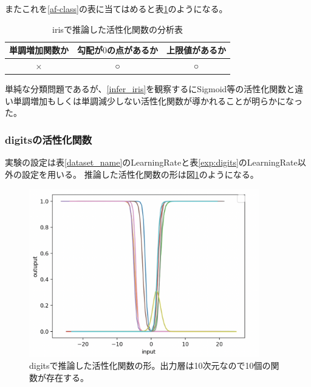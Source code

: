 またこれを\ref{af-class}の表に当てはめると表\ref{anal_iris}のようになる。
\begin{table}[htbp]
    \begin{center}
        \caption{irisで推論した活性化関数の分析表}
        \label{anal_iris}
        \vspace{2mm} 
        \begin{tabular}{ |c|c|c| }
        \hline
        単調増加関数か & 勾配が$ 0 $の点があるか & 上限値があるか   \\
        \hline
        × & ○ & ○   \\
        \hline
        \end{tabular}
    \end{center}
\end{table}



単純な分類問題であるが、\ref{infer_iris}を観察するにSigmoid等の活性化関数と違い単調増加もしくは単調減少しない活性化関数が導かれることが明らかになった。




\subsubsection{digitsの活性化関数}
実験の設定は表\ref{dataset_name}のLearningRateと表\ref{exp:digits}のLearningRate以外の設定を用いる。
推論した活性化関数の形は図\ref{infer_digits}のようになる。
\begin{figure}[hbtp]
    \begin{center}
        \includegraphics[width=10cm]{asset/digits-0.1.png}
            \caption{digitsで推論した活性化関数の形。出力層は10次元なので10個の関数が存在する。}
            \label{infer_digits}
    \end{center}
\end{figure}

